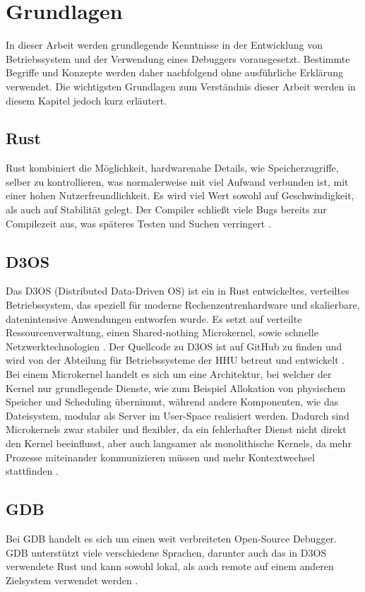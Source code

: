 \chapter{Grundlagen}

In dieser Arbeit werden grundlegende Kenntnisse in der Entwicklung von Betriebssystem und der Verwendung eines Debuggers vorausgesetzt. Bestimmte Begriffe und Konzepte werden daher nachfolgend ohne ausführliche Erklärung verwendet. Die wichtigsten Grundlagen zum Verständnis dieser Arbeit werden in diesem Kapitel jedoch kurz erläutert.

\section{Rust}
Rust kombiniert die Möglichkeit, hardwarenahe Details, wie Speicherzugriffe, selber zu kontrollieren, was normalerweise mit viel Aufwand verbunden ist, mit einer hohen Nutzerfreundlichkeit. Es wird viel Wert sowohl auf Geschwindigkeit, als auch auf Stabilität gelegt. Der Compiler schließt viele Bugs bereits zur Compilezeit aus, was späteres Testen und Suchen verringert \cite{rust-lang}. 

\section{D3OS}
Das D3OS (Distributed Data-Driven OS) ist ein in Rust entwickeltes, verteiltes Betriebssystem, das speziell für moderne Rechenzentrenhardware und skalierbare, datenintensive Anwendungen entworfen wurde. Es setzt auf verteilte Ressourcenverwaltung, einen Shared-nothing Microkernel, sowie schnelle Netzwerktechnologien \cite{d3os}. Der Quellcode zu D3OS ist auf GitHub zu finden und wird von der Abteilung für Betriebssysteme der HHU betreut und entwickelt \cite{d3os-repo}. \\
Bei einem Microkernel handelt es sich um eine Architektur, bei welcher der Kernel nur grundlegende Dienste, wie zum Beispiel Allokation von physischem Speicher und Scheduling übernimmt, während andere Komponenten, wie das Dateisystem, modular als Server im User-Space realisiert werden. Dadurch sind Microkernels zwar stabiler und flexibler, da ein fehlerhafter Dienst nicht direkt den Kernel beeinflusst, aber auch langsamer als monolithische Kernels, da mehr Prozesse miteinander kommunizieren müssen und mehr Kontextwechsel stattfinden \cite{microkernel}.

\section{GDB}
Bei GDB handelt es sich um einen weit verbreiteten Open-Source Debugger. GDB unterstützt viele verschiedene Sprachen, darunter auch das in D3OS verwendete Rust und kann sowohl lokal, als auch remote auf einem anderen Zielsystem verwendet werden \cite{gdb}. 

